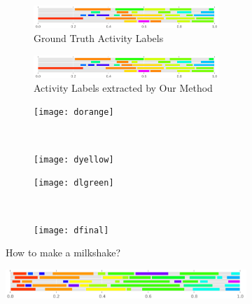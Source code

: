 \begin{figure}
\begin{subfigure}[b]{0.47\textwidth}
      \begin{subfigure}[b]{\textwidth}
      \includegraphics[width=\textwidth]{gt_ms_2}
      \caption*{Ground Truth Activity Labels}
    \end{subfigure}
    \begin{subfigure}[b]{\textwidth}
      \includegraphics[width=\textwidth]{gt_ms_2}
      \caption*{Activity Labels extracted by Our Method}
    \end{subfigure}
    \begin{subfigure}[b]{0.5\textwidth}
      \texttt{[image: dorange]}
      \color[HTML]{FF8400}{Fill the blender to the first line with milk.}
    \end{subfigure}~
    \begin{subfigure}[b]{0.5\textwidth}
      \texttt{[image: dyellow]}
      \color[HTML]{FFDA00}{If you want a thicker milkshake, add more ice cream.}
    \end{subfigure}
    \begin{subfigure}[b]{0.5\textwidth}
      \texttt{[image: dlgreen]}
      \color[HTML]{CEFF00}{Mix the milkshake, first at high speed then low.}
    \end{subfigure}~
    \begin{subfigure}[b]{0.5\textwidth}
      \texttt{[image: dfinal]}
      \color[HTML]{77FF00}{Pour the milkshake into a glass.}
    \end{subfigure}
    \caption{How to make a milkshake?}
    \label{recipe:milkshake}
  \end{subfigure}
\caption{Temporal segmentation of the videos by our method and ground truth segmentation. We also color code the learned activity labels and visualize sample frames and the automatically generated captions for some of them. \emph{Best viewed in color.}}
\iffalse
\begin{subfigure}[b]{0.5\textwidth}
\includegraphics[width=\textwidth]{act_gt_2}

\end{subfigure}
\end{figure}
